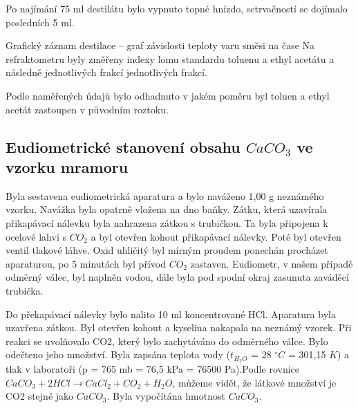 \documentclass[13pt, a4paper, twoside]{article}
\begin{document}
Po najímání 75 ml destilátu bylo vypnuto topné hnízdo, setrvačností se dojímalo posledních 5 ml.

Grafický záznam destilace – graf závislosti teploty varu směsi na čase
Na refraktometru byly změřeny indexy lomu standardu toluenu a ethyl acetátu a následně jednotlivých frakcí jednotlivých frakcí.

Podle naměřených údajů bylo odhadnuto v jakém poměru byl toluen a ethyl acetát zastoupen v původním roztoku.

\subsection*{Eudiometrické stanovení obsahu $CaCO_3$ ve vzorku mramoru}
Byla sestavena eudiometrická aparatura  a bylo naváženo 1,00 g neznámého vzorku. Navážka byla opatrně vložena na dno baňky. Zátku, která uzavírala přikapávací nálevku byla nahrazena zátkou s trubičkou. Ta byla připojena k ocelové lahvi s $CO_2$ a byl otevřen kohout přikapávací nálevky. Poté byl otevřen ventil tlakové láhve. Oxid uhličitý byl mírným proudem ponechán procházet aparaturou, po 5 minutách byl přívod $CO_2$ zastaven. Eudiometr, v našem případě odměrný válec, byl naplněn vodou, dále byla pod spodní okraj zasunuta zaváděcí trubička.


Do překapávací nálevky bylo nalito 10 ml koncentrované HCl. Aparatura byla uzavřena zátkou. Byl otevřen kohout a kyselina nakapala na neznámý vzorek. Při reakci se uvolňovalo CO2, který bylo zachytáváno do odměrného válce. Bylo odečteno jeho množství. Byla zapsána teplota vody ($t_{H_2O}$ = 28 $^{\circ}C$ = 301,15 $K$) a tlak v laboratoři (p = 765 mb = 76,5 kPa = 76500 Pa).Podle rovnice $CaCO_3 + 2HCl \to CaCl_2 + CO_2 + H_2O$, můžeme vidět, že látkové množství je CO2 stejné jako $CaCO_3$. Byla vypočítána hmotnost $CaCO_3$.
\end{document}
